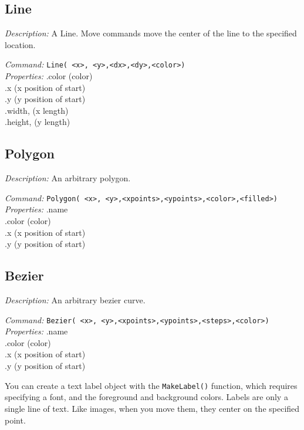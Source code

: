 \subsection{Line}
\emph{Description:} A Line. Move commands move the center
  of the line to the specified location.

\emph{Command:}  \verb+Line( <x>, <y>,<dx>,<dy>,<color>)+\\

\emph{Properties:}
.color (color) \\
.x  (x position of start) \\
.y  (y position of start)\\
.width, (x length)\\
.height,  (y length)\\




\subsection{Polygon}
\emph{Description:} An arbitrary polygon. 

\emph{Command:}  \verb+Polygon( <x>, <y>,<xpoints>,<ypoints>,<color>,<filled>)+\\

\emph{Properties:}
.name\\
.color (color) \\
.x  (x position of start) \\
.y  (y position of start)\\

\subsection{Bezier}
\emph{Description:} An arbitrary bezier curve.

\emph{Command:}  \verb+Bezier( <x>, <y>,<xpoints>,<ypoints>,<steps>,<color>)+\\

\emph{Properties:}
.name\\
.color (color) \\
.x  (x position of start) \\
.y  (y position of start)\\

\newpage
{}

You can create a text label object with the \texttt{MakeLabel()} function, 
which requires specifying a font, and the foreground and background colors.  Labels are only a single line of text. Like images, when you move them,
they center on the specified point.

